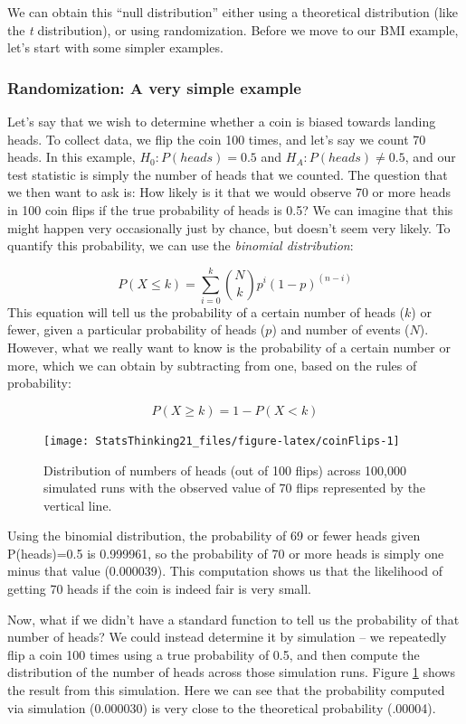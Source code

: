 \documentclass[12pt,]{book}
\theoremstyle{definition}
\theoremstyle{definition}
\theoremstyle{definition}
\theoremstyle{remark}
\begin{document}
We can obtain this ``null distribution'' either using a theoretical distribution (like the \emph{t} distribution), or using randomization. Before we move to our BMI example, let's start with some simpler examples.

\hypertarget{randomization-very-simple}{%
\subsubsection{Randomization: A very simple example}\label{randomization-very-simple}}

Let's say that we wish to determine whether a coin is biased towards landing heads. To collect data, we flip the coin 100 times, and let's say we count 70 heads. In this example, \(H_0: P(heads)=0.5\) and \(H_A: P(heads) \neq 0.5\), and our test statistic is simply the number of heads that we counted. The question that we then want to ask is: How likely is it that we would observe 70 or more heads in 100 coin flips if the true probability of heads is 0.5? We can imagine that this might happen very occasionally just by chance, but doesn't seem very likely. To quantify this probability, we can use the \emph{binomial distribution}:

\[
P(X \le k) = \sum_{i=0}^k \binom{N}{k} p^i (1-p)^{(n-i)}
\]
This equation will tell us the probability of a certain number of heads (\(k\)) or fewer, given a particular probability of heads (\(p\)) and number of events (\(N\)). However, what we really want to know is the probability of a certain number or more, which we can obtain by subtracting from one, based on the rules of probability:

\[
P(X \ge k) = 1 - P(X < k)
\]

\begin{figure}
\texttt{[image: StatsThinking21\_files/figure-latex/coinFlips-1]} \caption{Distribution of numbers of heads (out of 100 flips) across 100,000 simulated runs with the observed value of 70 flips represented by the vertical line.}\label{fig:coinFlips}
\end{figure}

Using the binomial distribution, the probability of 69 or fewer heads given P(heads)=0.5 is 0.999961, so the probability of 70 or more heads is simply one minus that value (0.000039).
This computation shows us that the likelihood of getting 70 heads if the coin is indeed fair is very small.

Now, what if we didn't have a standard function to tell us the probability of that number of heads? We could instead determine it by simulation -- we repeatedly flip a coin 100 times using a true probability of 0.5, and then compute the distribution of the number of heads across those simulation runs. Figure \ref{fig:coinFlips} shows the result from this simulation. Here we can see that the probability computed via simulation (0.000030) is very close to the theoretical probability (.00004).
\end{document}
